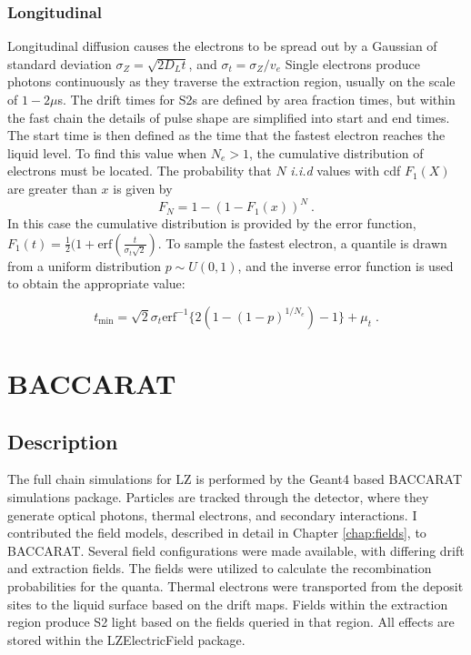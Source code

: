 \subsubsection{Longitudinal}
Longitudinal diffusion causes the electrons to be spread out by a Gaussian of standard deviation $\sigma_Z = \sqrt{2 D_L t}$, and $\sigma_t = \sigma_Z/v_e$
Single electrons produce photons continuously as they traverse the extraction region, usually on the scale of $1-2\mu$s.
The drift times for S2s are defined by area fraction times, but within the fast chain the details of pulse shape are simplified into start and end times.
The start time is then defined as the time that the fastest electron reaches the liquid level.
To find this value when $N_e > 1$, the cumulative distribution of electrons must be located.
The probability that $N$ \textit{i.i.d} values with cdf $F_1(X)$ are greater than $x$ is given by
\begin{equation}
    F_N = 1- (1-F_1(x))^N~.
\end{equation}
\noindent
In this case the cumulative distribution is provided by the error function, $F_1(t) = \frac{1}{2}(1 + \text{erf}(\frac{t}{\sigma_t \sqrt{2}})$.
To sample the fastest electron, a quantile is drawn from a uniform distribution $p \sim U(0,1)$, and the inverse error function is used to obtain the appropriate value:

\begin{equation}
    t_{\text{min}} = \sqrt{2}\sigma_t\text{erf}^{-1}\{2(1-(1-p)^{1/N_e})-1\} + \mu_t\;.
\end{equation}

\afterpage{\FloatBarrier}
\section{BACCARAT }
\subsection{Description}
The full chain simulations for LZ is performed by the Geant4\cite{agostinelli_geant4simulation_2003} based BACCARAT simulations package.
Particles are tracked through the detector, where they generate optical photons, thermal electrons, and secondary interactions.
I contributed the field models, described in detail in Chapter \ref{chap:fields}, to BACCARAT.
Several field configurations were made available, with differing drift and extraction fields. 
The fields were utilized to calculate the recombination probabilities for the quanta.
Thermal electrons were transported from the deposit sites to the liquid surface based on the drift maps. 
Fields within the extraction region produce S2 light based on the fields queried in that region.
All effects are stored within the LZElectricField package.

